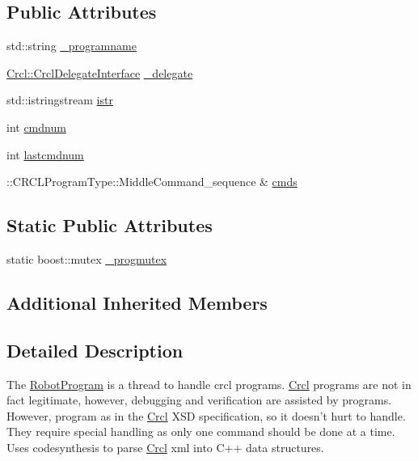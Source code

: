 \subsection*{Public Attributes}
\begin{DoxyCompactItemize}
\item 
std\-::string \hyperlink{classRCS_1_1RobotProgram_aca7d780729e20c6d4e3988883b87527d}{\-\_\-programname}
\item 
\hyperlink{classCrcl_1_1CrclDelegateInterface}{Crcl\-::\-Crcl\-Delegate\-Interface} \hyperlink{classRCS_1_1RobotProgram_addf6e9d586d1fde1aa2b8105268d9e66}{\-\_\-delegate}
\item 
std\-::istringstream \hyperlink{classRCS_1_1RobotProgram_a0099964c452870619bd0ee7651ffb072}{istr}
\item 
int \hyperlink{classRCS_1_1RobotProgram_ad43243236b573d0e3fc39d4890a43373}{cmdnum}
\item 
int \hyperlink{classRCS_1_1RobotProgram_a6c6a9242582933fa673b9d486913514c}{lastcmdnum}
\item 
\-::C\-R\-C\-L\-Program\-Type\-::\-Middle\-Command\-\_\-sequence \& \hyperlink{classRCS_1_1RobotProgram_ad6ed8ea72249e836521b2f7d7feb3523}{cmds}
\end{DoxyCompactItemize}
\subsection*{Static Public Attributes}
\begin{DoxyCompactItemize}
\item 
static boost\-::mutex \hyperlink{classRCS_1_1RobotProgram_ad80469b94591e96c6a221e4769612668}{\-\_\-progmutex}
\end{DoxyCompactItemize}
\subsection*{Additional Inherited Members}


\subsection{Detailed Description}
The \hyperlink{classRCS_1_1RobotProgram}{Robot\-Program} is a thread to handle crcl programs. \hyperlink{namespaceCrcl}{Crcl} programs are not in fact legitimate, however, debugging and verification are assisted by programs. However, program as in the \hyperlink{namespaceCrcl}{Crcl} X\-S\-D specification, so it doesn't hurt to handle. They require special handling as only one command should be done at a time. Uses codesynthesis to parse \hyperlink{namespaceCrcl}{Crcl} xml into C++ data structures. 

